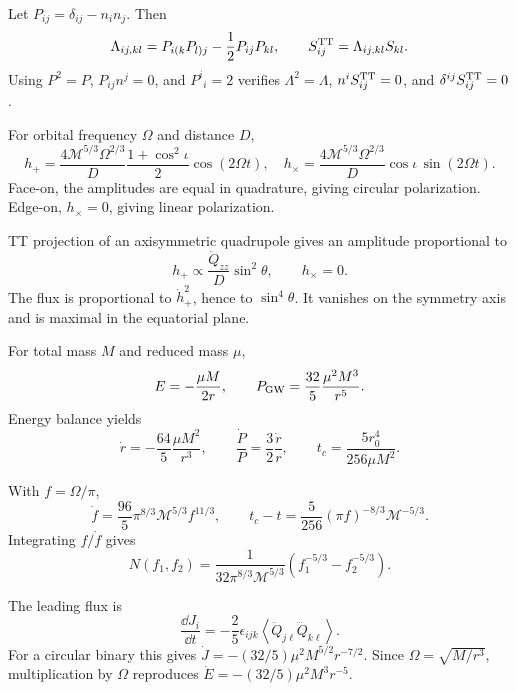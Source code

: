 \begin{solution}
Let \(P_{ij}=\delta_{ij}-n_in_j\).  Then
\[
\Lambda_{ij,kl}=P_{i(k}P_{l)j}-\frac12P_{ij}P_{kl},
\qquad
S_{ij}^{\rm TT}=\Lambda_{ij,kl}S_{kl}.
\]
Using \(P^2=P\), \(P_{ij}n^j=0\), and \(P^i{}_i=2\) verifies
\(\Lambda^2=\Lambda\), \(n^iS_{ij}^{\rm TT}=0\), and
\(\delta^{ij}S_{ij}^{\rm TT}=0\).
\end{solution}

\begin{solution}
For orbital frequency \(\Omega\) and distance \(D\),
\[
h_+=\frac{4\mathcal M^{5/3}\Omega^{2/3}}{D}
\frac{1+\cos^2\iota}{2}\cos(2\Omega t),
\quad
h_\times=\frac{4\mathcal M^{5/3}\Omega^{2/3}}{D}
\cos\iota\,\sin(2\Omega t).
\]
Face-on, the amplitudes are equal in quadrature, giving circular
polarization.  Edge-on, \(h_\times=0\), giving linear polarization.
\end{solution}

\begin{solution}
TT projection of an axisymmetric quadrupole gives an amplitude proportional
to
\[
h_+\propto\frac{\ddot Q_{zz}}{D}\sin^2\theta,\qquad h_\times=0.
\]
The flux is proportional to \(\dot h_+^2\), hence to
\(\sin^4\theta\).  It vanishes on the symmetry axis and is maximal in the
equatorial plane.
\end{solution}

\begin{solution}
For total mass \(M\) and reduced mass \(\mu\),
\[
E=-\frac{\mu M}{2r},\qquad
P_{\rm GW}=\frac{32}{5}\frac{\mu^2M^3}{r^5}.
\]
Energy balance yields
\[
\dot r=-\frac{64}{5}\frac{\mu M^2}{r^3},\qquad
\frac{\dot P}{P}=\frac32\frac{\dot r}{r},\qquad
t_c=\frac{5r_0^4}{256\mu M^2}.
\]
\end{solution}

\begin{solution}
With \(f=\Omega/\pi\),
\[
\dot f=\frac{96}{5}\pi^{8/3}\mathcal M^{5/3}f^{11/3},
\qquad
t_c-t=\frac{5}{256}(\pi f)^{-8/3}\mathcal M^{-5/3}.
\]
Integrating \(f/\dot f\) gives
\[
N(f_1,f_2)=\frac{1}{32\pi^{8/3}\mathcal M^{5/3}}
\left(f_1^{-5/3}-f_2^{-5/3}\right).
\]
\end{solution}

\begin{solution}
The leading flux is
\[
\frac{\dd J_i}{\dd t}
=-\frac{2}{5}\epsilon_{ijk}
\left\langle\ddot Q_{j\ell}\dddot Q_{k\ell}\right\rangle.
\]
For a circular binary this gives
\(\dot J=-(32/5)\mu^2M^{5/2}r^{-7/2}\).  Since
\(\Omega=\sqrt{M/r^3}\), multiplication by \(\Omega\) reproduces
\(\dot E=-(32/5)\mu^2M^3r^{-5}\).
\end{solution}

